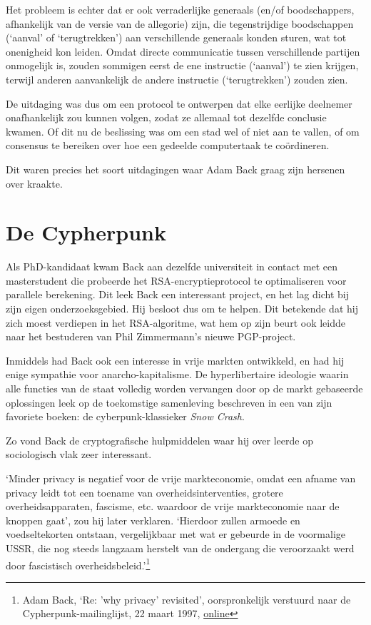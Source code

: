 \documentclass[smalldemyvopaper,11pt,twoside,onecolumn,openright,extrafontsizes,hidelinks]{memoir}
\begin{document}
Het probleem is echter dat er ook verraderlijke generaals (en/of
boodschappers, afhankelijk van de versie van de allegorie) zijn, die
tegenstrijdige boodschappen (`aanval' of `terugtrekken') aan
verschillende generaals konden sturen, wat tot onenigheid kon leiden.
Omdat directe communicatie tussen verschillende partijen onmogelijk is,
zouden sommigen eerst de ene instructie (`aanval') te zien krijgen,
terwijl anderen aanvankelijk de andere instructie (`terugtrekken')
zouden zien.

De uitdaging was dus om een protocol te ontwerpen dat elke eerlijke
deelnemer onafhankelijk zou kunnen volgen, zodat ze allemaal tot
dezelfde conclusie kwamen. Of dit nu de beslissing was om een stad wel
of niet aan te vallen, of om consensus te bereiken over hoe een gedeelde
computertaak te coördineren.

Dit waren precies het soort uitdagingen waar Adam Back graag zijn
hersenen over kraakte.

\section{De Cypherpunk}\label{de-cypherpunk}

Als PhD-kandidaat kwam Back aan dezelfde universiteit in contact met een
masterstudent die probeerde het RSA-encryptieprotocol te optimaliseren
voor parallele berekening. Dit leek Back een interessant project, en het
lag dicht bij zijn eigen onderzoeksgebied. Hij besloot dus om te helpen.
Dit betekende dat hij zich moest verdiepen in het RSA-algoritme, wat hem
op zijn beurt ook leidde naar het bestuderen van Phil Zimmermann's
nieuwe PGP-project.

Inmiddels had Back ook een interesse in vrije markten ontwikkeld, en had
hij enige sympathie voor anarcho-kapitalisme. De hyperlibertaire
ideologie waarin alle functies van de staat volledig worden vervangen
door op de markt gebaseerde oplossingen leek op de toekomstige
samenleving beschreven in een van zijn favoriete boeken: de
cyberpunk-klassieker \emph{Snow Crash}.

Zo vond Back de cryptografische hulpmiddelen waar hij over leerde op
sociologisch vlak zeer interessant.

`Minder privacy is negatief voor de vrije markteconomie, omdat een
afname van privacy leidt tot een toename van overheidsinterventies,
grotere overheidsapparaten, fascisme, etc. waardoor de vrije
markteconomie naar de knoppen gaat', zou hij later verklaren. `Hierdoor
zullen armoede en voedseltekorten ontstaan, vergelijkbaar met wat er
gebeurde in de voormalige USSR, die nog steeds langzaam herstelt van de
ondergang die veroorzaakt werd door fascistisch
overheidsbeleid.'\footnote{Adam Back, `Re: 'why privacy' revisited',
  oorspronkelijk verstuurd naar de Cypherpunk-mailinglijst, 22 maart
  1997,
  \href{https://cypherpunks.venona.com/date/1997/03/msg00586.html}{online}}
\end{document}
